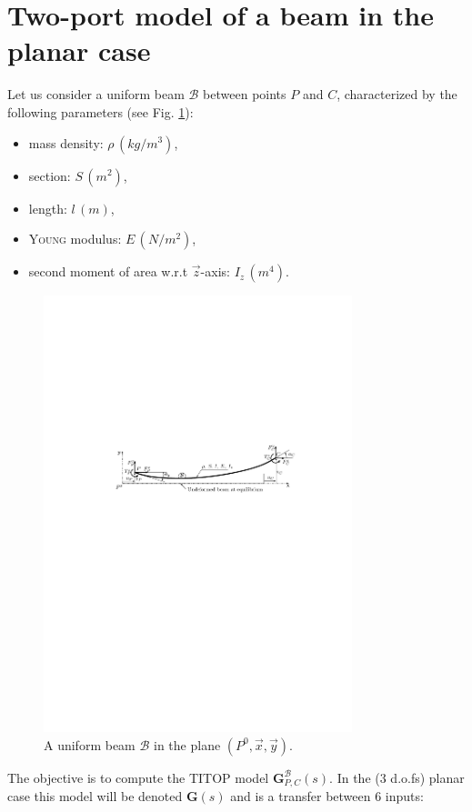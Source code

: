 \documentclass[smallcondensed]{svjour3}     %
\begin{document}
\section{Two-port model of a beam in the planar case}\label{sect:2}
Let us consider a uniform beam $\mathcal{B}$ between points $P$ and $C$, characterized by the following parameters (see Fig. \ref{fig:flexion_4}):
\begin{itemize}
\item mass density: $\rho\,(kg/m^3)$,
\item section: $S\,(m^2)$,
\item length: $l\,(m)$,
\item \textsc{Young} modulus: $E\, (N/m^2)$,
\item second moment of area w.r.t $\vec{z}$-axis: $I_z\, (m^4)$.
\end{itemize}
\begin{figure}[htbp!]
  \includegraphics[width=0.8\textwidth]{flexion_4b}
\caption{A uniform beam $\mathcal{B}$ in the plane $(P^0,\vec{x},\vec{y})$.}
\label{fig:flexion_4} 
\end{figure}
The objective is to compute the TITOP model $\mathbf{G}_{P,C}^{\mathcal{B}}(s)$. In the ($3$ d.o.fs) planar case this model will be denoted $\mathbf{G}(s)$ and is a transfer between 6 inputs:
\end{document}
